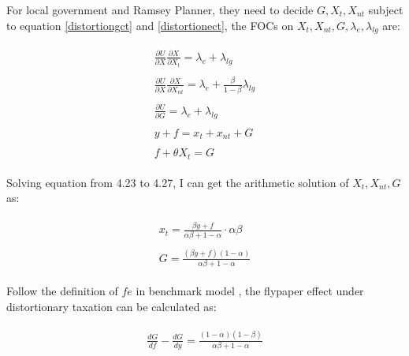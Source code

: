 For local government and Ramsey Planner, they need to decide $G, X_t, X_{nt}$ subject to equation \ref*{distortiongct} and \ref*{distortionect}, the FOCs on $X_t, X_{nt}, G, \lambda_e, \lambda_{lg}$ are:

\begin{align}
    \begin{split}
        \frac{\partial U}{\partial X} \frac{\partial X}{\partial X_t}=\lambda_e+\lambda_{l g}
    \end{split}                                                      \\
    \begin{split}
        \frac{\partial U}{\partial X} \frac{\partial X}{\partial X_{nt}}=\lambda_e +\frac{\beta}{1-\beta} \lambda_{l g}
    \end{split} \\
    \begin{split}
        \frac{\partial U}{\partial G}=\lambda_e+\lambda_{l g}
    \end{split}                                                                                      \\
    \begin{split}
        y+f=x_t+x_{nt}+G
    \end{split}                                                                                                                           \\
    \begin{split}
        f+\theta X_t=G
    \end{split}
\end{align}

Solving equation from 4.23 to 4.27, I can get the arithmetic solution of $X_t, X_{nt}, G$ as:

\begin{align}
    \begin{split}
        x_t=\frac{\beta y+f}{\alpha \beta+1-\alpha} \cdot \alpha \beta
    \end{split} \\
    \begin{split}
        G=\frac{(\beta y+f)(1-\alpha)}{\alpha \beta+1-\alpha}
    \end{split}
\end{align}

Follow the definition of $fe$ in benchmark model , the flypaper effect under distortionary taxation can be calculated as:

\begin{align}
    \begin{split}
        \frac{d G}{d f}-\frac{d G}{d y}=\frac{(1-\alpha)(1-\beta)}{\alpha \beta+1-\alpha}  \label{feunderdistortion}
    \end{split}
\end{align}

